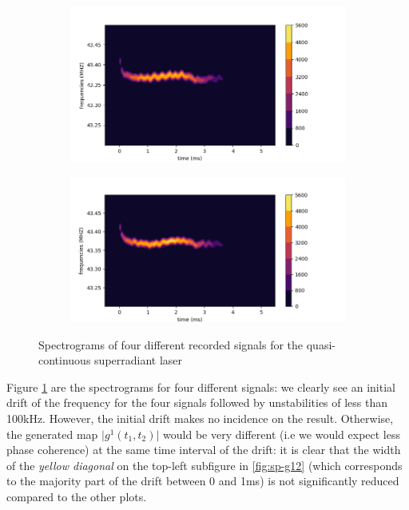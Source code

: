 \documentclass[11pt]{report}
\begin{document}
\begin{figure}[h!]
\centering
\begin{subfigure}{.48\textwidth}
  \centering
  \includegraphics[width=1.1\linewidth]{spec3-44}
\end{subfigure}%
\hspace{1em}%
\begin{subfigure}{.48\textwidth}
  \centering
  \includegraphics[width=1.1\linewidth]{spec3-45}
\end{subfigure}
\caption{Spectrograms of four different recorded signals for the quasi-continuous superradiant laser}
\label{fig:spectrograms}
\end{figure}

Figure \ref{fig:spectrograms} are the spectrograms for four different signals: we clearly see an initial drift of the frequency for the four signals followed by unstabilities of less than 100kHz. However, the initial drift makes no incidence on the result. Otherwise, the generated map $\vert g^1(t_1, t_2) \vert$ would be very different (i.e we would expect less phase coherence) at the same time interval of the drift: it is clear that the width of the \textit{yellow diagonal} on the top-left subfigure in \ref{fig:sp-g12} (which corresponds to the majority part of the drift between 0 and 1ms) is not significantly reduced compared to the other plots.
\end{document}
